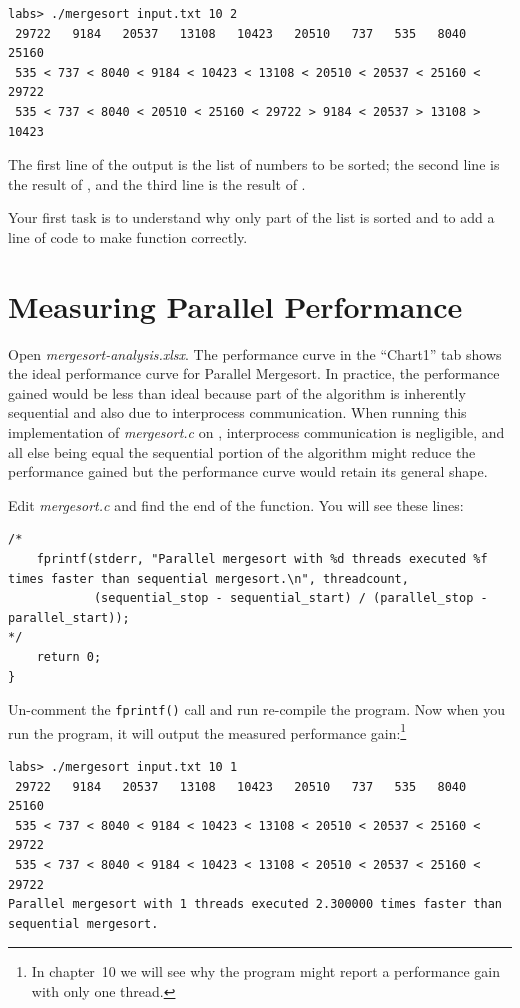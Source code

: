 \begin{verbatim}
labs> ./mergesort input.txt 10 2
 29722   9184   20537   13108   10423   20510   737   535   8040   25160
 535 < 737 < 8040 < 9184 < 10423 < 13108 < 20510 < 20537 < 25160 < 29722
 535 < 737 < 8040 < 20510 < 25160 < 29722 > 9184 < 20537 > 13108 > 10423
\end{verbatim}
The first line of the output is the list of numbers to be sorted; the second
line is the result of , and the third line is
the result of .

Your first task is to understand why only part of the list is sorted and to add
a line of code to make  function correctly.

\section{Measuring Parallel Performance}

Open \textit{mergesort-analysis.xlsx}. The performance curve in the ``Chart1''
tab shows the ideal performance curve for Parallel Mergesort. In practice, the
performance gained would be less than ideal because part of the algorithm is
inherently sequential and also due to interprocess communication. When running
this implementation of \textit{mergesort.c} on \runtimeenvironment,
interprocess communication is negligible, and all else being equal the
sequential portion of the algorithm might reduce the performance gained but the
performance curve would retain its general shape.

Edit \textit{mergesort.c} and find the end of the  function. You
will see these lines:
\begin{lstlisting}
/*
    fprintf(stderr, "Parallel mergesort with %d threads executed %f times faster than sequential mergesort.\n", threadcount,
            (sequential_stop - sequential_start) / (parallel_stop - parallel_start));
*/
    return 0;
}
\end{lstlisting}
Un-comment the \lstinline{fprintf()} call and run re-compile the program. Now
when you run the program, it will output the measured performance
gain:\footnote{In chapter~10 we will see why the program might report a
performance gain with only one thread.}
\begin{verbatim}
labs> ./mergesort input.txt 10 1
 29722   9184   20537   13108   10423   20510   737   535   8040   25160
 535 < 737 < 8040 < 9184 < 10423 < 13108 < 20510 < 20537 < 25160 < 29722
 535 < 737 < 8040 < 9184 < 10423 < 13108 < 20510 < 20537 < 25160 < 29722
Parallel mergesort with 1 threads executed 2.300000 times faster than sequential mergesort.
\end{verbatim}

